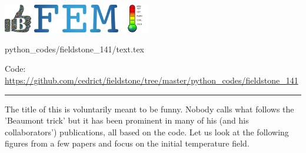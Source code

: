 \includegraphics[height=1.25cm]{images/pictograms/benchmark}
\includegraphics[height=1.25cm]{images/pictograms/FEM}
\includegraphics[height=1.25cm]{images/pictograms/temperature}


\begin{flushright} {\tiny {\color{gray} python\_codes/fieldstone\_141/text.tex}} \end{flushright}



\begin{center}
Code: \url{https://github.com/cedrict/fieldstone/tree/master/python_codes/fieldstone_141}
\end{center}

\par\noindent\rule{\textwidth}{0.4pt}

The title of this \stone is voluntarily meant to be funny. 
Nobody calls what follows the 'Beaumont trick' but it has been 
prominent in many of his (and his collaborators') publications, all based on the \sopale code.
Let us look at the following figures from a few papers and focus on the 
initial temperature field.

